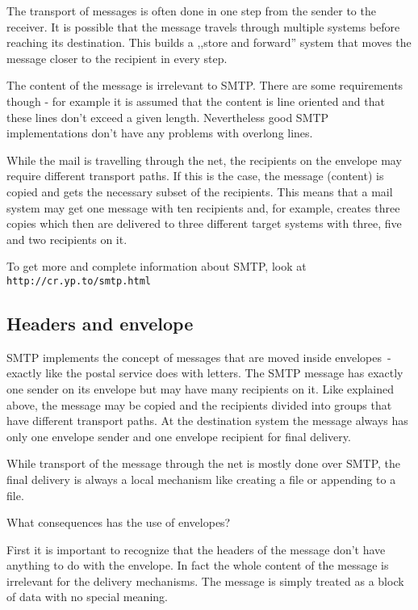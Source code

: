 \documentclass{article}
\begin{document}
The transport of messages is often done in one step from the sender
to the receiver. It is possible that the message travels through
multiple systems before reaching its destination. This builds a
,,store and forward'' system that moves the message closer to the
recipient in every step.

The content of the message is irrelevant to SMTP.
There are some requirements though - for example it is assumed that the
content is line oriented and that these lines don't exceed a given
length. Nevertheless good SMTP implementations don't have any problems
with overlong lines.

While the mail is travelling through the net, the recipients on the
envelope may require different transport paths. If this is the case, the
message (content) is copied and gets the necessary subset of the
recipients. This means that a mail system may get one message with
ten recipients and, for example, creates three copies which then are delivered
to three different target systems with three, five and two recipients on it.

To get more and complete information about SMTP, look at\\
\texttt{http://cr.yp.to/smtp.html}

\subsection{Headers and envelope}

SMTP implements the concept of messages that are moved
inside envelopes~- exactly like the postal service does with letters.
The SMTP message has exactly one sender on its envelope but may have
many recipients on it. Like explained above, the message may be copied
and the recipients divided into groups that have different transport
paths. At the destination system the message always has only
one envelope sender and one envelope recipient for final delivery.

While transport of the message through the net is mostly done over SMTP,
the final delivery is always a local mechanism like creating a file or
appending to a file.

What consequences has the use of envelopes?

First it is important to recognize that the headers of the message don't
have anything to do with the envelope. In fact the whole content of the
message is irrelevant for the delivery mechanisms. The message is simply
treated as a block of data with no special meaning.
\end{document}
